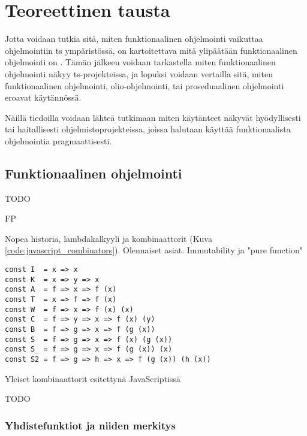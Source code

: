 \vspace{21.5pt}
\chapter{Teoreettinen tausta}

Jotta voidaan tutkia sitä, miten funktionaalinen ohjelmointi vaikuttaa ohjelmointiin \gls{ts} ympäristössä, on kartoitettava mitä ylipäätään funktionaalinen ohjelmointi on . Tämän jälkeen voidaan tarkastella miten funktionaalinen ohjelmointi näkyy \gls{ts}-projekteissa, ja lopuksi voidaan vertailla sitä, miten funktionaalinen ohjelmointi, olio-ohjelmointi, tai proseduaalinen ohjelmointi eroavat käytännössä.

Näillä tiedoilla voidaan lähteä tutkimaan miten käytänteet näkyvät hyödyllisesti tai haitallisesti ohjelmistoprojekteissa, joissa halutaan käyttää funktionaalista ohjelmointia pragmaattisesti.

\section{Funktionaalinen ohjelmointi}

TODO

FP

Nopea historia, lambdakalkyyli ja kombinaattorit (Kuva \ref{code:javascript_combinators}). Olennaiset asiat. Immutability ja "pure function"

\begin{code}
	\begin{verbatim}
const I  = x => x
const K  = x => y => x
const A  = f => x => f (x)
const T  = x => f => f (x)
const W  = f => x => f (x) (x)
const C  = f => y => x => f (x) (y)
const B  = f => g => x => f (g (x))
const S  = f => g => x => f (x) (g (x))
const S_ = f => g => x => f (g (x)) (x)
const S2 = f => g => h => x => f (g (x)) (h (x))
\end{verbatim}
	\caption{Yleiset kombinaattorit esitettynä JavaScriptissä \cite{javascript_combinators}}
	\label{code:javascript_combinators}
\end{code}

TODO

\subsection{Yhdistefunktiot ja niiden merkitys}

